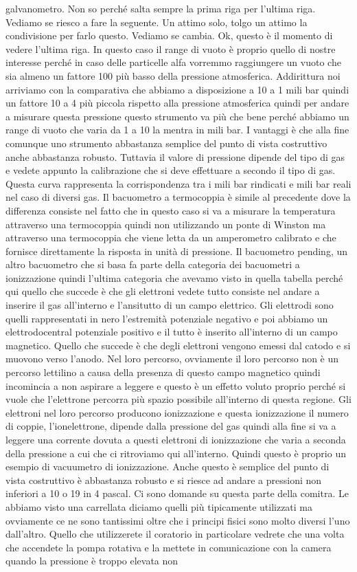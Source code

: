 galvanometro. Non so perché salta sempre la prima riga per l'ultima riga. Vediamo se riesco a fare la seguente. Un attimo solo, tolgo un attimo la condivisione per farlo questo. Vediamo se cambia. Ok, questo è il momento di vedere l'ultima riga. In questo caso il range di vuoto è proprio quello di nostre interesse perché in caso delle particelle alfa vorremmo raggiungere un vuoto che sia almeno un fattore 100 più basso della pressione atmosferica. Addirittura noi arriviamo con la comparativa che abbiamo a disposizione a 10 a 1 mili bar quindi un fattore 10 a 4 più piccola rispetto alla pressione atmosferica quindi per andare a misurare questa pressione questo strumento va più che bene perché abbiamo un range di vuoto che varia da 1 a 10 la mentra in mili bar. I vantaggi è che alla fine comunque uno strumento abbastanza semplice del punto di vista costruttivo anche abbastanza robusto. Tuttavia il valore di pressione dipende del tipo di gas e vedete appunto la calibrazione che si deve effettuare a secondo il tipo di gas. Questa curva rappresenta la corrispondenza tra i mili bar rindicati e mili bar reali nel caso di diversi gas. Il bacuometro a termocoppia è simile al precedente dove la differenza consiste nel fatto che in questo caso si va a misurare la temperatura attraverso una termocoppia quindi non utilizzando un ponte di Winston ma attraverso una termocoppia che viene letta da un amperometro calibrato e che fornisce direttamente la risposta in unità di pressione. Il bacuometro pending, un altro bacuometro che si basa fa parte della categoria dei bacuometri a ionizzazione quindi l'ultima categoria che avevamo visto in quella tabella perché qui quello che succede è che gli elettroni vedete tutto consiste nel andare a inserire il gas all'interno e l'ansitutto di un campo elettrico. Gli elettrodi sono quelli rappresentati in nero l'estremità potenziale negativo e poi abbiamo un elettrodocentral potenziale positivo e il tutto è inserito all'interno di un campo magnetico. Quello che succede è che degli elettroni vengono emessi dal catodo e si muovono verso l'anodo. Nel loro percorso, ovviamente il loro percorso non è un percorso lettilino a causa della presenza di questo campo magnetico quindi incomincia a non aspirare a leggere e questo è un effetto voluto proprio perché si vuole che l'elettrone percorra più spazio possibile all'interno di questa regione. Gli elettroni nel loro percorso producono ionizzazione e questa ionizzazione il numero di coppie, l'ionelettrone, dipende dalla pressione del gas quindi alla fine si va a leggere una corrente dovuta a questi elettroni di ionizzazione che varia a seconda della pressione a cui che ci ritroviamo qui all'interno. Quindi questo è proprio un esempio di vacuumetro di ionizzazione. Anche questo è semplice del punto di vista costruttivo è abbastanza robusto e si riesce ad andare a pressioni non inferiori a 10 o 19 in 4 pascal. Ci sono domande su questa parte della comitra. Le abbiamo visto una carrellata diciamo quelli più tipicamente utilizzati ma ovviamente ce ne sono tantissimi oltre che i principi fisici sono molto diversi l'uno dall'altro. Quello che utilizzerete il coratorio in particolare vedrete che una volta che accendete la pompa rotativa e la mettete in comunicazione con la camera quando la pressione è troppo elevata non 